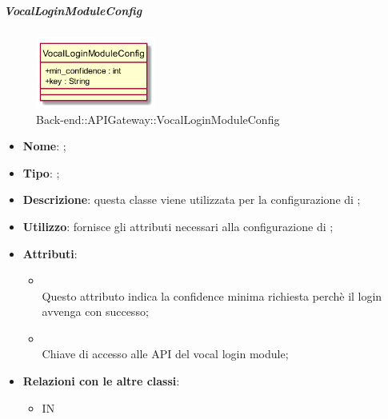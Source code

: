 \hypertarget{VocalLoginModuleConfig_label}{\subparagraph{VocalLoginModuleConfig}}
\begin{figure}[h]
	\centering
	\includegraphics[width=0.35\textwidth,height=\textheight,keepaspectratio]{images/ClassVocalLoginModuleConfig.png}
	\caption{Back-end::APIGateway::VocalLoginModuleConfig}
\end{figure}
\begin{itemize}
	\item \textbf{Nome}: ;
	\item \textbf{Tipo}: ;
	\item \textbf{Descrizione}: questa classe viene utilizzata per la configurazione di ;
	\item \textbf{Utilizzo}: fornisce gli attributi necessari alla configurazione di ;
	\item \textbf{Attributi}:
	\begin{itemize}
		\item[]  \\
		Questo attributo indica la confidence minima richiesta perchè il login avvenga con successo;
		\item[]  \\
		Chiave di accesso alle API del vocal login module;
	\end{itemize}
	\item \textbf{Relazioni con le altre classi}:
	\begin{itemize}
		\item IN \hyperlink{VocalLoginMicrosoftModule_label}{}
	\end{itemize}
\end{itemize}
\FloatBarrier

